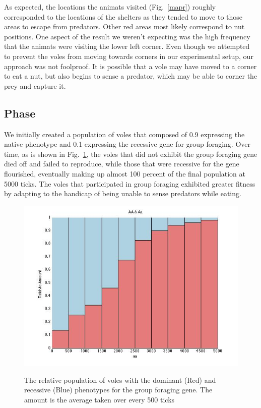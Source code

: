 \documentclass[10pt,conference,letterpaper,doublecolumn]{IEEEtran}
\begin{document}
 As expected, the locations the animats visited (Fig.~\ref{mapr}) roughly corresponded to the locations of the shelters as they tended to move to those areas to escape from predators. Other red areas most likely correspond to nut positions. One aspect of the result we weren’t expecting was the high frequency that the animats were visiting the lower left corner. Even though we attempted to prevent the voles from moving towards corners in our experimental setup, our approach was not foolproof. It is possible that a vole may have moved to a corner to eat a nut, but also begins to sense a predator, which may be able to corner the prey and capture it.


\subsection{Phase \uppercase\expandafter{}}
We initially created a population of voles that composed of 0.9 expressing the native phenotype and 0.1 expressing the recessive gene for group foraging. Over time, as is shown in Fig.~\ref{p3}, the voles that did not exhibit the group foraging gene died off and failed to reproduce, while those that were recessive for the gene flourished, eventually making up almost 100 percent of the final population at 5000 ticks. The voles that participated in group foraging exhibited greater fitness by adapting to the handicap of being unable to sense predators while eating.

\begin{figure}[H]
  \centering
  \includegraphics[scale=0.45]{phase3.jpg} \\
  \caption{The relative population of voles with the dominant (Red) and recessive (Blue) phenotypes for the group foraging gene. The amount is the average taken over every 500 ticks}
  \label{p3}
\end{figure}
\end{document}
